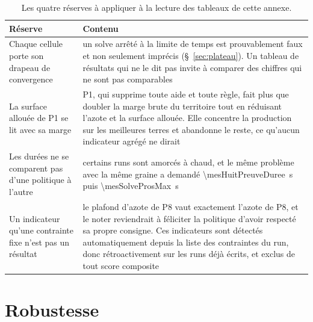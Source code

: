 \begin{table}[H]
  \centering
  \caption{Les quatre réserves à appliquer à la lecture des tableaux de cette annexe.}
  \label{tab:ann-lectures}
  \scriptsize
  \setlength{\tabcolsep}{4pt}
  \begin{tabularx}{\textwidth}{@{}>{\raggedright\arraybackslash}p{34mm}X@{}}
    \toprule
    \textbf{Réserve} & \textbf{Contenu} \\
    \midrule
    Chaque cellule porte son drapeau de convergence & un solve arrêté à la limite de temps est
      prouvablement faux et non seulement imprécis (§~\ref{sec:plateau}). Un tableau de
      résultats qui ne le dit pas invite à comparer des chiffres qui ne sont pas comparables \\
    La surface allouée de P1 se lit avec sa marge & P1, qui supprime toute aide et toute règle,
      fait plus que doubler la marge brute du territoire tout en réduisant l'azote et la
      surface allouée. Elle concentre la production sur les meilleures terres et abandonne le
      reste, ce qu'aucun indicateur agrégé ne dirait \\
    Les durées ne se comparent pas d'une politique à l'autre & certains runs sont amorcés à
      chaud, et le même problème avec la même graine a demandé \SI{\mesHuitPreuveDuree}{\second}
      puis \SI{\mesSolveProsMax}{\second} \\
    Un indicateur qu'une contrainte fixe n'est pas un résultat & le plafond d'azote de P8 vaut
      exactement l'azote de P8, et le noter reviendrait à féliciter la politique d'avoir
      respecté sa propre consigne. Ces indicateurs sont détectés automatiquement depuis la
      liste des contraintes du run, donc rétroactivement sur les runs déjà écrits, et exclus de
      tout score composite \\
    \bottomrule
  \end{tabularx}
\end{table}

\section{Robustesse}

